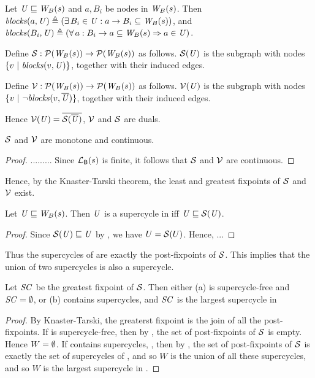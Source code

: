 \begin{definition} \label{defn:blocks}
Let $\mathit{U} \sqsubseteq \mathit{W}_{B}({s})$ and $a, B_i$ be nodes in $\mathit{W}_{B}({s})$. Then 
$\mathit{blocks}(a, \mathit{U}) \triangleq (\exists\, B_i \in \mathit{U} : a \rightarrow B_i \subseteq \mathit{W}_{B}({s}))$, and 
$\mathit{blocks}(B_i, \mathit{U}) \triangleq (\forall\, a : B_i \rightarrow a \subseteq\mathit{W}_{B}({s}) \Rightarrow a \in \mathit{U})$.
\end{definition}

\bd \label{defn:scFix}
Define $\mathcal{S}: \mathcal{P}(\mathit{W}_{B}({s})) \to \mathcal{P}(\mathit{W}_{B}({s}))$ as follows.
$\mathcal{S}(\mathit{U})$ is the subgraph with nodes $\{ v ~|~ \mathit{blocks}(v, \mathit{U})  \}$, together with their induced edges.
\ed


\begin{definition}\label{defn:violFix}
Define $\mathcal{V}: \mathcal{P}(\mathit{W}_{B}({s})) \to \mathcal{P}(\mathit{W}_{B}({s}))$ as follows.
$\mathcal{V}(\mathit{U})$ is the subgraph with nodes ${\{ v ~|~ \neg \mathit{blocks}(v, \overline{\mathit{\mathit{U}}}) \}}$, together with their induced edges.
\end{definition}
%
Hence $\mathcal{V}(\mathit{U}) = \overline{\mathcal{S}(\overline{\mathit{U}})}$, \ie $\mathcal{V}$ and $\mathcal{S}$ are duals.

\begin{proposition} \label{prop:monotone}
$\mathcal{S}$ and $\mathcal{V}$ are monotone and continuous.
\end{proposition}
%
\begin{proof}
.........
Since $\mathcal{L}_{\mathsf{B}}({s})$ is finite, it follows that $\mathcal{S}$ and $\mathcal{V}$ are continuous.
\end{proof}

Hence, by the Knaster-Tarski theorem, the least and greatest fixpoints of $\mathcal{S}$ and $\mathcal{V}$ exist.

\begin{proposition} \label{prop:supercycleGFP}
Let $\mathit{U} \sqsubseteq \mathit{W}_{B}({s})$. Then $\mathit{U}$ is a supercycle in  iff $\mathit{U} \sqsubseteq \mathcal{S}(\mathit{U})$.
\end{proposition}
%
\begin{proof}
Since $\mathcal{S}(\mathit{U}) \sqsubseteq \mathit{U}$ by , we have $U = \mathcal{S}(U)$. Hence, ...
\end{proof}

Thus the supercycles of  are exactly the post-fixpoints of $\mathcal{S}$. This implies that the union of two supercycles is also a supercycle. 

\begin{proposition} \label{prop:GFPisLargestSC}
Let $\mathit{SC}$ be the greatest fixpoint of $\mathcal{S}$. Then either
(a)  is supercycle-free and $\mathit{SC} = \emptyset$, or 
(b)  contains supercycles, and $\mathit{SC}$ is the largest supercycle in 
\end{proposition}
%
\begin{proof}
By Knaster-Tarski, the greaterst fixpoint is the join of all the post-fixpoints. 
If  is supercycle-free, then by , the set of post-fixpoints of $\mathcal{S}$ is empty. 
Hence $W = \emptyset$.
If  contains supercycles, , then by ,  the set of post-fixpoints of $\mathcal{S}$ is exactly the set of 
supercycles of , and so $W$ is the union of all these supercycles, and so $W$ is the largest supercycle in .
\end{proof}

